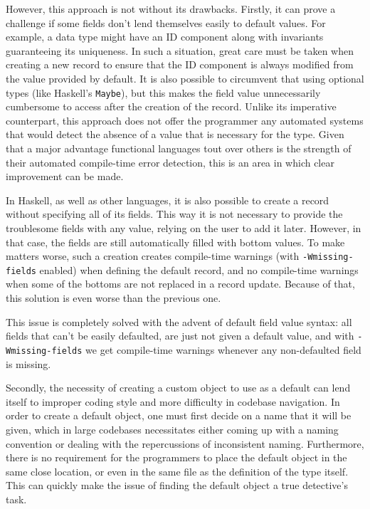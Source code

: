 \documentclass[en]{pracamgr}
\begin{document}
However, this approach is not without its drawbacks.
Firstly, it can prove a challenge if some fields don't lend themselves easily to default values. 
For example, a data type might have an ID component along with invariants guaranteeing its uniqueness. 
In such a situation, great care must be taken when creating a new record to ensure that the ID component is always modified from the value provided by default.
It is also possible to circumvent that using optional types (like Haskell's \texttt{Maybe}), 
but this makes the field value unnecessarily cumbersome to access after the creation of the record.
Unlike its imperative counterpart, this approach does not offer the programmer any automated systems 
that would detect the absence of a value that is necessary for the type.
Given that a major advantage functional languages tout over others is the strength of their automated compile-time error detection, 
this is an area in which clear improvement can be made.

In Haskell, as well as other languages, it is also possible to create a record without specifying all of its fields.
This way it is not necessary to provide the troublesome fields with any value, relying on the user to add it later.
However, in that case, the fields are still automatically filled with bottom values.
To make matters worse, such a creation creates compile-time warnings (with \texttt{-Wmissing-fields} enabled) when defining the default record, 
and no compile-time warnings when some of the bottoms are not replaced in a record update.
Because of that, this solution is even worse than the previous one.

This issue is completely solved with the advent of default field value syntax: all fields that can't be easily defaulted, 
are just not given a default value, and with \texttt{-Wmissing-fields} we get compile-time warnings whenever any non-defaulted field is missing. 

Secondly, the necessity of creating a custom object to use as a default can lend itself to improper coding style and more difficulty in codebase navigation.
In order to create a default object, one must first decide on a name that it will be given, which in large codebases 
necessitates either coming up with a naming convention or dealing with the repercussions of inconsistent naming. 
Furthermore, there is no requirement for the programmers to place the default object in the same close location, 
or even in the same file as the definition of the type itself.
This can quickly make the issue of finding the default object a true detective's task. 
\end{document}
